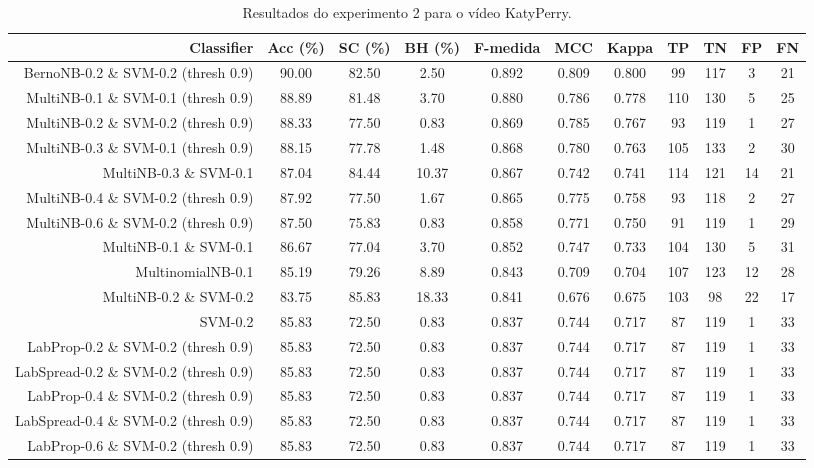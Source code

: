 \begin{table}[!htb]
\centering
\caption{Resultados do experimento 2 para o vídeo KatyPerry.}
\label{tab:KatyPerry}
\begin{tabular}{r|c|c|c|c|c|c|c|c|c|c}
\hline\hline
Classifier & Acc (\%) & SC (\%) & BH (\%) & F-medida & MCC & Kappa & TP & TN & FP & FN \\ \hline
BernoNB-0.2 \& SVM-0.2 (thresh 0.9) & 90.00 & 82.50 & 2.50 & 0.892 & 0.809 & 0.800 & 99 & 117 & 3 & 21 \\ 
MultiNB-0.1 \& SVM-0.1 (thresh 0.9) & 88.89 & 81.48 & 3.70 & 0.880 & 0.786 & 0.778 & 110 & 130 & 5 & 25 \\ 
MultiNB-0.2 \& SVM-0.2 (thresh 0.9) & 88.33 & 77.50 & 0.83 & 0.869 & 0.785 & 0.767 & 93 & 119 & 1 & 27 \\ 
MultiNB-0.3 \& SVM-0.1 (thresh 0.9) & 88.15 & 77.78 & 1.48 & 0.868 & 0.780 & 0.763 & 105 & 133 & 2 & 30 \\ 
MultiNB-0.3 \& SVM-0.1 & 87.04 & 84.44 & 10.37 & 0.867 & 0.742 & 0.741 & 114 & 121 & 14 & 21 \\ 
MultiNB-0.4 \& SVM-0.2 (thresh 0.9) & 87.92 & 77.50 & 1.67 & 0.865 & 0.775 & 0.758 & 93 & 118 & 2 & 27 \\ 
MultiNB-0.6 \& SVM-0.2 (thresh 0.9) & 87.50 & 75.83 & 0.83 & 0.858 & 0.771 & 0.750 & 91 & 119 & 1 & 29 \\ 
MultiNB-0.1 \& SVM-0.1 & 86.67 & 77.04 & 3.70 & 0.852 & 0.747 & 0.733 & 104 & 130 & 5 & 31 \\ 
MultinomialNB-0.1 & 85.19 & 79.26 & 8.89 & 0.843 & 0.709 & 0.704 & 107 & 123 & 12 & 28 \\ 
MultiNB-0.2 \& SVM-0.2 & 83.75 & 85.83 & 18.33 & 0.841 & 0.676 & 0.675 & 103 & 98 & 22 & 17 \\ 
SVM-0.2 & 85.83 & 72.50 & 0.83 & 0.837 & 0.744 & 0.717 & 87 & 119 & 1 & 33 \\ 
LabProp-0.2 \& SVM-0.2 (thresh 0.9) & 85.83 & 72.50 & 0.83 & 0.837 & 0.744 & 0.717 & 87 & 119 & 1 & 33 \\ 
LabSpread-0.2 \& SVM-0.2 (thresh 0.9) & 85.83 & 72.50 & 0.83 & 0.837 & 0.744 & 0.717 & 87 & 119 & 1 & 33 \\ 
LabProp-0.4 \& SVM-0.2 (thresh 0.9) & 85.83 & 72.50 & 0.83 & 0.837 & 0.744 & 0.717 & 87 & 119 & 1 & 33 \\ 
LabSpread-0.4 \& SVM-0.2 (thresh 0.9) & 85.83 & 72.50 & 0.83 & 0.837 & 0.744 & 0.717 & 87 & 119 & 1 & 33 \\ 
LabProp-0.6 \& SVM-0.2 (thresh 0.9) & 85.83 & 72.50 & 0.83 & 0.837 & 0.744 & 0.717 & 87 & 119 & 1 & 33 \\ 

\end{tabular}
\end{table}
